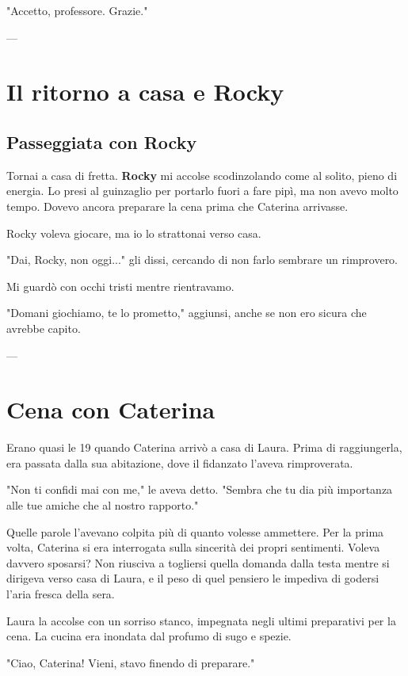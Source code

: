 "Accetto, professore. Grazie."

---

\section{Il ritorno a casa e Rocky}

\subsection{Passeggiata con Rocky}

Tornai a casa di fretta. \textbf{Rocky} mi accolse scodinzolando come al solito, pieno di energia. Lo presi al guinzaglio per portarlo fuori a fare pipì, ma non avevo molto tempo. Dovevo ancora preparare la cena prima che Caterina arrivasse.

Rocky voleva giocare, ma io lo strattonai verso casa.

"Dai, Rocky, non oggi..." gli dissi, cercando di non farlo sembrare un rimprovero.

Mi guardò con occhi tristi mentre rientravamo.

"Domani giochiamo, te lo prometto," aggiunsi, anche se non ero sicura che avrebbe capito.

---

\section{Cena con Caterina}

Erano quasi le 19 quando Caterina arrivò a casa di Laura. Prima di raggiungerla, era passata dalla sua abitazione, dove il fidanzato l'aveva rimproverata.

"Non ti confidi mai con me," le aveva detto. "Sembra che tu dia più importanza alle tue amiche che al nostro rapporto."

Quelle parole l'avevano colpita più di quanto volesse ammettere. Per la prima volta, Caterina si era interrogata sulla sincerità dei propri sentimenti. Voleva davvero sposarsi? Non riusciva a togliersi quella domanda dalla testa mentre si dirigeva verso casa di Laura, e il peso di quel pensiero le impediva di godersi l'aria fresca della sera.

Laura la accolse con un sorriso stanco, impegnata negli ultimi preparativi per la cena. La cucina era inondata dal profumo di sugo e spezie.

"Ciao, Caterina! Vieni, stavo finendo di preparare."

